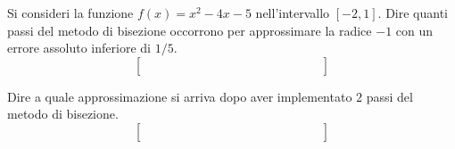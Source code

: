 Si consideri la funzione $f(x)=x^2-4x-5$ nell'intervallo 
$[-2,1]$. Dire quanti passi del metodo di bisezione occorrono per 
approssimare la radice $-1$ con un errore assoluto inferiore di 
$1/5$.
\medskip
\[
\left [
\begin{array}{cccccccccccccc}
\quad &  \quad & \quad &  \quad & \quad & \quad & \quad & \quad  \\
\quad &  \quad & \quad &  \quad & \quad &  \quad & \quad & \quad \\
\quad &  \quad & \quad &  \quad  & \quad  & \quad & \quad & \quad
\end{array}\right]
\]

\medskip
\noindent Dire a quale approssimazione si arriva dopo aver 
implementato $2$ passi del metodo di bisezione.\\
\medskip
\[
\left [
\begin{array}{cccccccccccccc}
\quad &  \quad & \quad &  \quad & \quad & \quad & \quad & \quad  \\
\quad &  \quad & \quad &  \quad & \quad &  \quad & \quad & \quad \\
\quad &  \quad & \quad &  \quad  & \quad  & \quad & \quad & \quad
\end{array}\right]
\]

